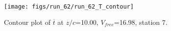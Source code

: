 \begin{figure}[H]
\centering
\texttt{[image: figs/run\_62/run\_62\_T\_contour]}
\caption{Contour plot of $\overline{t}$ at $z/c$=10.00, $V_{free}$=16.98, station 7.}
\end{figure}


